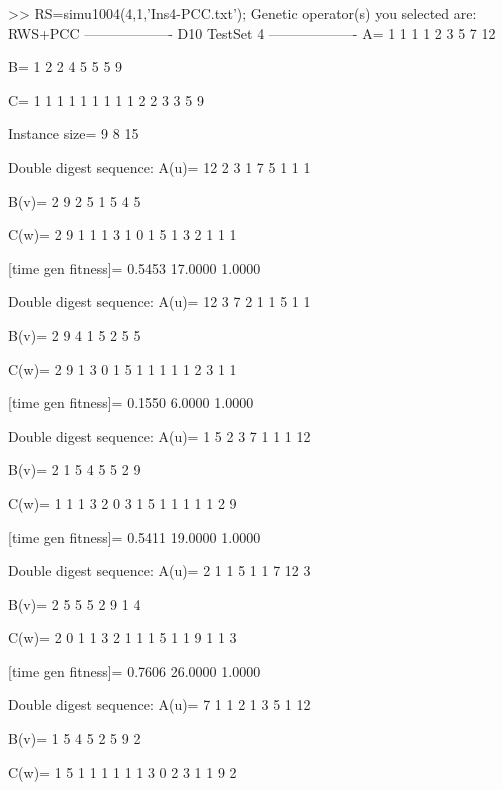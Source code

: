 >> RS=simu1004(4,1,'Ins4-PCC.txt');
Genetic operator(s) you selected are:
RWS+PCC
------------------- D10 TestSet 4 -------------------
A=
     1     1     1     1     2     3     5     7    12

B=
     1     2     2     4     5     5     5     9

C=
     1     1     1     1     1     1     1     1     1     2     2     3     3     5     9

Instance size=
     9     8    15

Double digest sequence:
A(u)=
    12     2     3     1     7     5     1     1     1

B(v)=
     2     9     2     5     1     5     4     5

C(w)=
     2     9     1     1     1     3     1     0     1     5     1     3     2     1     1     1

[time gen fitness]=
    0.5453   17.0000    1.0000

Double digest sequence:
A(u)=
    12     3     7     2     1     1     5     1     1

B(v)=
     2     9     4     1     5     2     5     5

C(w)=
     2     9     1     3     0     1     5     1     1     1     1     1     2     3     1     1

[time gen fitness]=
    0.1550    6.0000    1.0000

Double digest sequence:
A(u)=
     1     5     2     3     7     1     1     1    12

B(v)=
     2     1     5     4     5     5     2     9

C(w)=
     1     1     1     3     2     0     3     1     5     1     1     1     1     1     2     9

[time gen fitness]=
    0.5411   19.0000    1.0000

Double digest sequence:
A(u)=
     2     1     1     5     1     1     7    12     3

B(v)=
     2     5     5     5     2     9     1     4

C(w)=
     2     0     1     1     3     2     1     1     1     5     1     1     9     1     1     3

[time gen fitness]=
    0.7606   26.0000    1.0000

Double digest sequence:
A(u)=
     7     1     1     2     1     3     5     1    12

B(v)=
     1     5     4     5     2     5     9     2

C(w)=
     1     5     1     1     1     1     1     1     3     0     2     3     1     1     9     2

